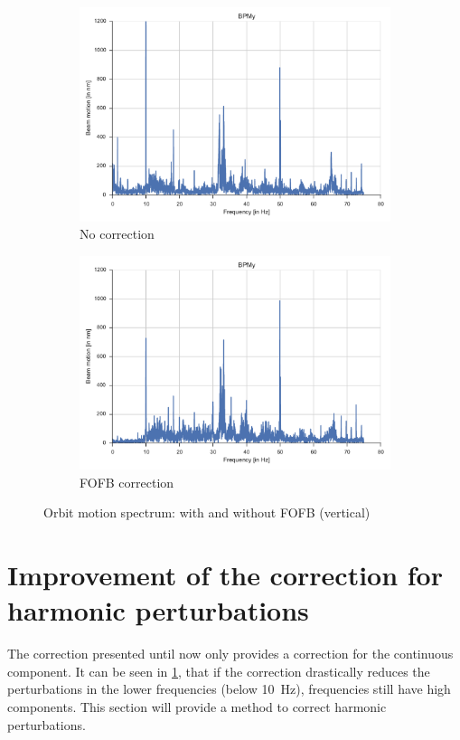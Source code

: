 \begin{figure}
    \centering
    \begin{subfigure}[b]{0.8\textwidth}
        \includegraphics[width=\linewidth]{img/fft_no_corr}
        \caption{No correction}
    \end{subfigure}
    
    \begin{subfigure}[b]{0.8\textwidth}
        \includegraphics[width=\linewidth]{img/fft_fofb}
        \caption{FOFB correction}
    \end{subfigure}
    \caption{\label{fig:compare_fofb}Orbit motion spectrum: with and without FOFB (vertical)}
\end{figure}

\section{Improvement of the correction for harmonic perturbations}
\label{sec:dyn_corr}
The correction presented until now only provides a correction for the continuous component. It can be seen in \cref{fig:compare_fofb}, that if the correction drastically reduces the perturbations in the lower frequencies (below \SI{10}{\hertz}), frequencies still have high components. This section will provide a method to correct harmonic perturbations.

